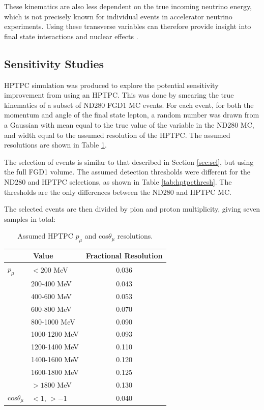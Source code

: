 These kinematics are also less dependent on the true incoming neutrino energy, which is not precisely known for individual events in accelerator neutrino experiments. Using these transverse variables can therefore provide insight into final state interactions and nuclear effects \cite{stv3}.

\subsection{Sensitivity Studies}

HPTPC simulation was produced to explore the potential sensitivity improvement from using an HPTPC. This was done by smearing the true kinematics of a subset of ND280 FGD1 MC events. For each event, for both the momentum and angle of the final state lepton, a random number was drawn from a Gaussian with mean equal to the true value of the variable in the ND280 MC, and width equal to the assumed resolution of the HPTPC. The assumed resolutions are shown in Table \ref{tab:hptpcres}.

The selection of events is similar to that described in Section \ref{sec:sel}, but using the full FGD1 volume. The assumed detection thresholds were different for the ND280 and HPTPC selections, as shown in Table \ref{tab:hptpcthresh}. The thresholds are the only differences between the ND280 and HPTPC MC.

The selected events are then divided by pion and proton multiplicity, giving seven samples in total:

\begin{center}
\begin{table}[!htbp]
\center
\begin{tabular}{l l||c}
\hline \hline
\multicolumn{2}{c||}{\textbf{Value}} & \textbf{Fractional Resolution}\\
\hline
\hline
$p_{\mu}$ & $<200$ MeV & 0.036 \\
 & 200-400 MeV & 0.043 \\
 & 400-600 MeV & 0.053 \\
 & 600-800 MeV & 0.070 \\
 & 800-1000 MeV & 0.090 \\
 & 1000-1200 MeV & 0.093 \\
 & 1200-1400 MeV & 0.110 \\
 & 1400-1600 MeV & 0.120 \\
 & 1600-1800 MeV & 0.125 \\
 & $>1800$ MeV & 0.130 \\  
\hline
cos$\theta_{\mu}$ & $<1$, $>-1$ & 0.040 \\
\hline \hline
\end{tabular}
\caption{Assumed HPTPC $p_{\mu}$ and cos$\theta_{\mu}$ resolutions.}
\label{tab:hptpcres}
\end{table}
\end{center}

